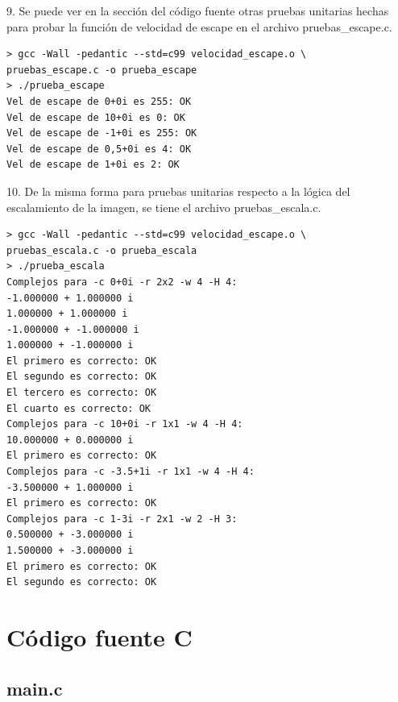 \documentclass[a4paper,10pt]{article}
\begin{document}
9. Se puede ver en la sección del código fuente otras pruebas unitarias hechas para probar la función de velocidad de escape en el archivo pruebas\_escape.c.
\begin{verbatim}
> gcc -Wall -pedantic --std=c99 velocidad_escape.o \
pruebas_escape.c -o prueba_escape
> ./prueba_escape
Vel de escape de 0+0i es 255: OK
Vel de escape de 10+0i es 0: OK
Vel de escape de -1+0i es 255: OK
Vel de escape de 0,5+0i es 4: OK
Vel de escape de 1+0i es 2: OK
\end{verbatim}

10. De la misma forma para pruebas unitarias respecto a la lógica del escalamiento de la imagen, se tiene el archivo pruebas\_escala.c.
\begin{verbatim}
> gcc -Wall -pedantic --std=c99 velocidad_escape.o \
pruebas_escala.c -o prueba_escala
> ./prueba_escala
Complejos para -c 0+0i -r 2x2 -w 4 -H 4:
-1.000000 + 1.000000 i
1.000000 + 1.000000 i
-1.000000 + -1.000000 i
1.000000 + -1.000000 i
El primero es correcto: OK
El segundo es correcto: OK
El tercero es correcto: OK
El cuarto es correcto: OK
Complejos para -c 10+0i -r 1x1 -w 4 -H 4:
10.000000 + 0.000000 i
El primero es correcto: OK
Complejos para -c -3.5+1i -r 1x1 -w 4 -H 4:
-3.500000 + 1.000000 i
El primero es correcto: OK
Complejos para -c 1-3i -r 2x1 -w 2 -H 3:
0.500000 + -3.000000 i
1.500000 + -3.000000 i
El primero es correcto: OK
El segundo es correcto: OK
\end{verbatim}

\pagebreak


\section{C\'odigo fuente C}

\subsection{main.c}
\end{document}
